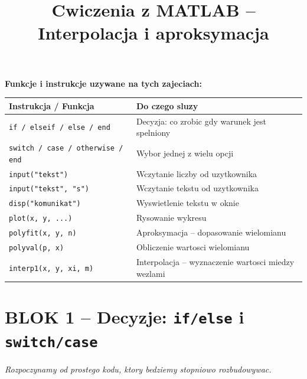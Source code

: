 \documentclass[12pt,a4paper]{article}
\title{\textbf{\Large Cwiczenia z MATLAB -- Interpolacja i aproksymacja}\\[4pt]}
\author{}
\date{}
\begin{document}
	
	\maketitle
	\thispagestyle{empty}
	
	
	
	\newpage
	\begin{infobox}
		
		\medskip
		\textbf{Funkcje i instrukcje uzywane na tych zajeciach:}
		\begin{center}
			\renewcommand{\arraystretch}{1.1}
			\begin{tabular}{p{5cm}p{8cm}}
				\toprule
				\textbf{Instrukcja / Funkcja} & \textbf{Do czego sluzy} \\
				\midrule
				\texttt{if / elseif / else / end} & Decyzja: co zrobic gdy warunek jest spelniony \\
				\texttt{switch / case / otherwise / end} & Wybor jednej z wielu opcji \\
				\texttt{input("tekst")} & Wczytanie liczby od uzytkownika \\
				\texttt{input("tekst", "s")} & Wczytanie tekstu od uzytkownika \\
				\texttt{disp("komunikat")} & Wyswietlenie tekstu w oknie \\
				\texttt{plot(x, y, ...)} & Rysowanie wykresu \\
				\texttt{polyfit(x, y, n)} & Aproksymacja -- dopasowanie wielomianu \\
				\texttt{polyval(p, x)} & Obliczenie wartosci wielomianu \\
				\texttt{interp1(x, y, xi, m)} & Interpolacja -- wyznaczenie wartosci miedzy wezlami \\
				\bottomrule
			\end{tabular}
		\end{center}
	\end{infobox}
	
	\newpage
	\section*{\textcolor{headerblue}{BLOK 1 -- Decyzje: \texttt{if/else} i \texttt{switch/case}}}
	\noindent\textit{Rozpoczynamy od prostego kodu, ktory bedziemy stopniowo rozbudowywac.}
	
\end{document}
